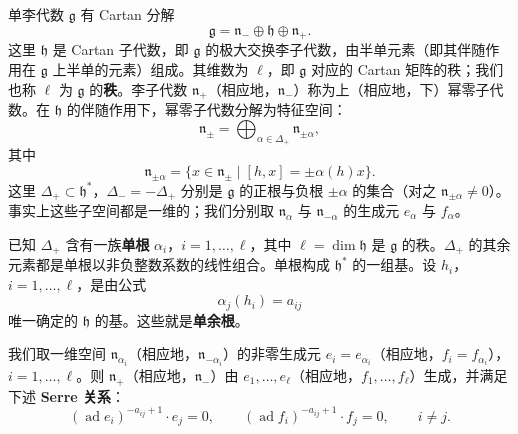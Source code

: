 

单李代数 $\mathfrak g$ 有 Cartan 分解
\[
    \mathfrak g=\mathfrak n_-\oplus\mathfrak h\oplus\mathfrak n_+.
\]
这里 $\mathfrak h$ 是 Cartan 子代数，即 $\mathfrak g$ 的极大交换李子代数，由半单元素（即其伴随作用在 $\mathfrak g$ 上半单的元素）组成。其维数为 $\ell$，即 $\mathfrak g$ 对应的 Cartan 矩阵的秩；我们也称 $\ell$ 为 $\mathfrak g$ 的\textbf{秩}。李子代数 $\mathfrak n_+$（相应地，$\mathfrak n_-$）称为上（相应地，下）幂零子代数。在 $\mathfrak h$ 的伴随作用下，幂零子代数分解为特征空间：
\[
    \mathfrak n_\pm=\bigoplus_{\alpha\in\Delta_+}\mathfrak n_{\pm\alpha},
\]
其中
\[
    \mathfrak n_{\pm\alpha}=\{x\in\mathfrak n_\pm\mid [h,x]=\pm\alpha(h)x\}.
\]
这里 $\Delta_+\subset\mathfrak h^*$，$\Delta_-=-\Delta_+$ 分别是 $\mathfrak g$ 的正根与负根 $\pm\alpha$ 的集合（对之 $\mathfrak n_{\pm\alpha}\neq0$）。事实上这些子空间都是一维的；我们分别取 $\mathfrak n_\alpha$ 与 $\mathfrak n_{-\alpha}$ 的生成元 $e_\alpha$ 与 $f_\alpha$。


已知 $\Delta_+$ 含有一族\textbf{单根} $\alpha_i$，$i=1,\dots,\ell$，其中 $\ell=\dim\mathfrak h$ 是 $\mathfrak g$ 的秩。$\Delta_+$ 的其余元素都是单根以非负整数系数的线性组合。单根构成 $\mathfrak h^*$ 的一组基。设 $h_i$，$i=1,\dots,\ell$，是由公式
\[
    \alpha_j(h_i)=a_{ij}
\]
唯一确定的 $\mathfrak h$ 的基。这些就是\textbf{单余根}。

我们取一维空间 $\mathfrak n_{\alpha_i}$（相应地，$\mathfrak n_{-\alpha_i}$）的非零生成元 $e_i=e_{\alpha_i}$（相应地，$f_i=f_{\alpha_i}$），$i=1,\dots,\ell$。则 $\mathfrak n_+$（相应地，$\mathfrak n_-$）由 $e_1,\dots,e_\ell$（相应地，$f_1,\dots,f_\ell$）生成，并满足下述 \textbf{Serre 关系}：
\[
    (\operatorname{ad} e_i)^{-a_{ij}+1}\cdot e_j=0,\qquad
    (\operatorname{ad} f_i)^{-a_{ij}+1}\cdot f_j=0,\qquad
    i\neq j.
\]

